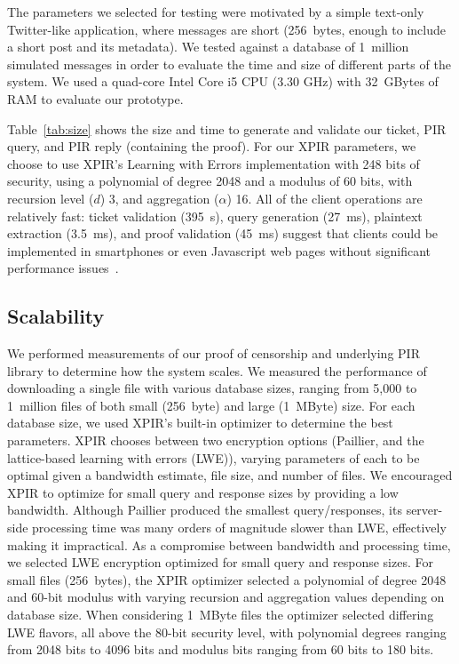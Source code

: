 The parameters we selected for testing were motivated by a simple text-only
Twitter-like application, where messages are short (256~bytes, enough to include
a short post and its metadata). We tested against a database of 1~million
simulated messages in order to evaluate the time and size of different parts of
the system. We used a quad-core Intel Core i5 CPU (3.30 GHz) with 32~GBytes of RAM
to evaluate our prototype.

\TabSizes

Table~\ref{tab:size} shows the size and time to generate and validate our
ticket, PIR query, and PIR reply (containing the proof). For our XPIR
parameters, we choose to use XPIR's Learning with Errors implementation with 248
bits of security, using a polynomial of degree 2048 and a modulus of 60 bits,
with recursion level ($d$) 3, and aggregation ($\alpha$) 16. All of
the client operations are relatively fast: ticket validation (395~{\textmu}s),
query generation (27~ms), plaintext extraction (3.5~ms), and proof validation (45~ms)
suggest that clients could be implemented in smartphones or even Javascript
web pages without significant performance issues~\cite{webcrypto}.

\subsection{Scalability} \label{ssec:poc-scalability}

We performed measurements of our proof of censorship
and underlying PIR library to determine how the system scales. We measured the
performance of downloading a single file with various database sizes, ranging
from 5,000 to 1~million files of both small (256~byte) and large (1~MByte) size.
For each database size, we used
XPIR's built-in optimizer to determine the best parameters. XPIR chooses between
two encryption options (Paillier, and the lattice-based learning
with errors (LWE)), varying parameters of each to be optimal given a bandwidth
estimate, file size, and number of files. We encouraged XPIR to optimize for
small query and response sizes by providing a low bandwidth. Although Paillier
produced the smallest query/responses, its
server-side processing time was many orders of magnitude slower than LWE, effectively making it
impractical. As a
compromise between bandwidth and processing time, we selected LWE encryption
optimized for small query and response sizes. For small files (256~bytes), the XPIR
optimizer selected a polynomial of degree 2048 and
60-bit modulus with varying recursion and aggregation values depending on
database size. When
considering 1~MByte files the optimizer selected differing LWE flavors, all
above the 80-bit security level, with polynomial degrees ranging from 2048 bits to
4096 bits and modulus bits ranging from 60 bits to 180 bits.

